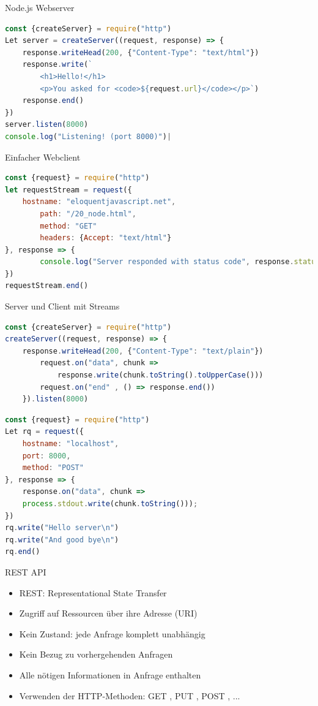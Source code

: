 \begin{concept}{Node.js Webserver}
\begin{lstlisting}[language=JavaScript, style=basesmol]
const {createServer} = require("http")
Let server = createServer((request, response) => {
    response.writeHead(200, {"Content-Type": "text/html"})
    response.write(`
        <h1>Hello!</h1>
        <p>You asked for <code>${request.url}</code></p>`)
    response.end()
})
server.listen(8000)
console.log("Listening! (port 8000)")|
\end{lstlisting}
\end{concept}


\begin{code}{Einfacher Webclient}
\begin{lstlisting}[language=JavaScript, style=basesmol]
const {request} = require("http")
let requestStream = request({
    hostname: "eloquentjavascript.net",
        path: "/20_node.html",
        method: "GET"
        headers: {Accept: "text/html"}
}, response => {
        console.log("Server responded with status code", response.statusCode)
})
requestStream.end()
\end{lstlisting}
\end{code}

\begin{examplecode}{Server und Client mit Streams}
\begin{lstlisting}[language=JavaScript, style=basesmol]
const {createServer} = require("http")
createServer((request, response) => {
    response.writeHead(200, {"Content-Type": "text/plain"})
        request.on("data", chunk =>
            response.write(chunk.toString().toUpperCase()))
        request.on("end" , () => response.end())
    }).listen(8000)
\end{lstlisting}

\begin{lstlisting}[language=JavaScript, style=basesmol]
const {request} = require("http")
Let rq = request({
    hostname: "localhost",
    port: 8000,
    method: "POST"
}, response => {
    response.on("data", chunk =>
    process.stdout.write(chunk.toString()));
})
rq.write("Hello server\n")
rq.write("And good bye\n")
rq.end()
\end{lstlisting}
\end{examplecode}

\begin{definition}{REST API}
\begin{itemize}
  \item REST: Representational State Transfer
  \item Zugriff auf Ressourcen über ihre Adresse (URI)
  \item Kein Zustand: jede Anfrage komplett unabhängig
  \item Kein Bezug zu vorhergehenden Anfragen
  \item Alle nötigen Informationen in Anfrage enthalten
  \item Verwenden der HTTP-Methoden: GET , PUT , POST , ...
\end{itemize}
\end{definition}

